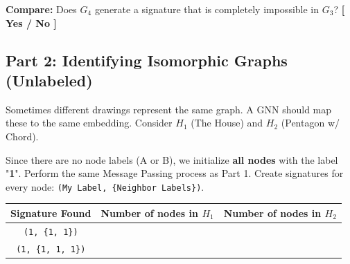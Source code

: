 \documentclass[a4paper, 12pt]{extarticle}
\begin{document}
\textbf{Compare:} Does $G_4$ generate a signature that is completely impossible in $G_3$? \textbf{[ Yes / No ]}

\subsection*{Part 2: Identifying Isomorphic Graphs (Unlabeled)}

Sometimes different drawings represent the same graph. A GNN should map these to the same embedding.
Consider $H_1$ (The House) and $H_2$ (Pentagon w/ Chord).

\begin{center}
\end{center}

Since there are no node labels (A or B), we initialize \textbf{all nodes} with the label "\textbf{1}". Perform the same Message Passing process as Part 1.
Create signatures for every node: \texttt{(My Label, \{Neighbor Labels\})}.

\begin{center}
\renewcommand{\arraystretch}{1.5}
\begin{tabular}{|c|c|c|}
    \hline
    \textbf{Signature Found} & \textbf{Number of nodes in $H_1$} & \textbf{Number of nodes in $H_2$} \\
    \hline
    \texttt{(1, \{1, 1\})} & \hspace{3cm} & \hspace{3cm} \\
    \hline
    \texttt{(1, \{1, 1, 1\})} & \hspace{3cm} & \hspace{3cm} \\
    \hline
\end{tabular}
\end{center}
\end{document}
